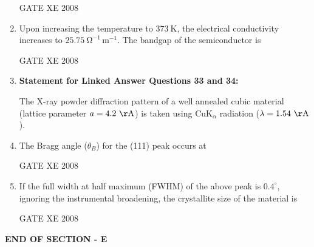 \documentclass[12pt]{article}
\begin{document}
\begin{enumerate}[label=Q\arabic*.]
    GATE XE 2008

    \item Upon increasing the temperature to $373 \ \mathrm{K}$, the electrical conductivity increases to $25.75 \ \mathrm{\Omega^{-1} \, m^{-1}}$. The bandgap of the semiconductor is

\begin{enumerate}[label=(\Alph*)]
\end{enumerate}
    
    GATE XE 2008

    \item[] \textbf{Statement for Linked Answer Questions 33 and 34:} 

    The X-ray powder diffraction pattern of a well annealed cubic material (lattice parameter $a = 4.2 \ \mathrm{\AA}$) is taken using CuK$_\alpha$ radiation ($\lambda = 1.54 \ \mathrm{\AA}$).

    \item The Bragg angle ($\theta_B$) for the (111) peak occurs at

\begin{enumerate}[label=(\Alph*)]
\end{enumerate}
   
    GATE XE 2008

    \item If the full width at half maximum (FWHM) of the above peak is $0.4^{\circ}$, ignoring the instrumental broadening, the crystallite size of the material is

\begin{enumerate}[label=(\Alph*)]
\end{enumerate}
    
    GATE XE 2008

\end{enumerate}    
\begin{center}
    \textbf{END OF SECTION - E}
\end{center}
\end{document}
